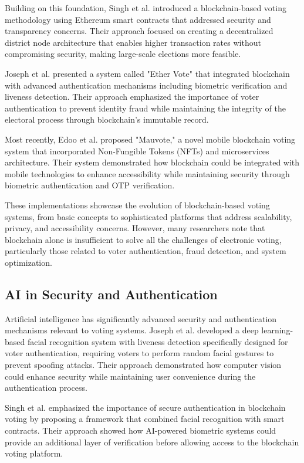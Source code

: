 \documentclass[conference]{IEEEtran}
\begin{document}
Building on this foundation, Singh et al. \cite{b5} introduced a blockchain-based voting methodology using Ethereum smart contracts that addressed security and transparency concerns. Their approach focused on creating a decentralized district node architecture that enables higher transaction rates without compromising security, making large-scale elections more feasible.

Joseph et al. \cite{b6} presented a system called "Ether Vote" that integrated blockchain with advanced authentication mechanisms including biometric verification and liveness detection. Their approach emphasized the importance of voter authentication to prevent identity fraud while maintaining the integrity of the electoral process through blockchain's immutable record.

Most recently, Edoo et al. \cite{b7} proposed "Mauvote," a novel mobile blockchain voting system that incorporated Non-Fungible Tokens (NFTs) and microservices architecture. Their system demonstrated how blockchain could be integrated with mobile technologies to enhance accessibility while maintaining security through biometric authentication and OTP verification.

These implementations showcase the evolution of blockchain-based voting systems, from basic concepts to sophisticated platforms that address scalability, privacy, and accessibility concerns. However, many researchers note that blockchain alone is insufficient to solve all the challenges of electronic voting, particularly those related to voter authentication, fraud detection, and system optimization.

\subsection{AI in Security and Authentication}
Artificial intelligence has significantly advanced security and authentication mechanisms relevant to voting systems. Joseph et al. \cite{b6} developed a deep learning-based facial recognition system with liveness detection specifically designed for voter authentication, requiring voters to perform random facial gestures to prevent spoofing attacks. Their approach demonstrated how computer vision could enhance security while maintaining user convenience during the authentication process.

Singh et al. \cite{b5} emphasized the importance of secure authentication in blockchain voting by proposing a framework that combined facial recognition with smart contracts. Their approach showed how AI-powered biometric systems could provide an additional layer of verification before allowing access to the blockchain voting platform.
\end{document}
